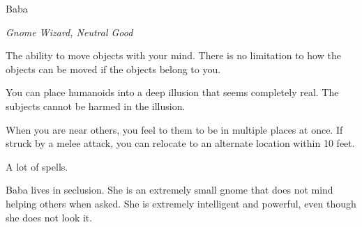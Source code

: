 \begin{monsterbox}{Baba}
	\begin{hangingpar}
		\textit{Gnome Wizard, Neutral Good}
	\end{hangingpar}
	\dndline%
	\basics[%
	armorclass = 24,
	hitpoints  = 302,
	speed      = 60 ft
	]
	\dndline%
	\stats[
	STR = \stat{8}, %
	DEX = \stat{16},
	CON = \stat{19},
	INT = \stat{20},
	WIS = \stat{20},
	CHA = \stat{19}
	]
	\dndline%
	\details[%
	languages = {Common, Elvish, Dwarvish, Gnomish, Halfling, Orc, Pandaren, Celestial, Draconic, Primordial},
	challenge = 20
	]
	\dndline%
	\begin{monsteraction}[Telekinesis]
		The ability to move objects with your mind. There is no limitation to how the objects can be moved if the objects belong to you.
	\end{monsteraction}	
	\begin{monsteraction}
		You can place humanoids into a deep illusion that seems completely real. The subjects cannot be harmed in the illusion.
	\end{monsteraction}	
	\begin{monsteraction}
		When you are near others, you feel to them to be in multiple places at once. If struck by a melee attack, you can relocate to an alternate location within 10 feet.
	\end{monsteraction}
	\begin{monsteraction}[Spells]
		A lot of spells.
	\end{monsteraction}
	Baba lives in seclusion. She is an extremely small gnome that does not mind helping others when asked. She is extremely intelligent and powerful, even though she does not look it.
\end{monsterbox}

